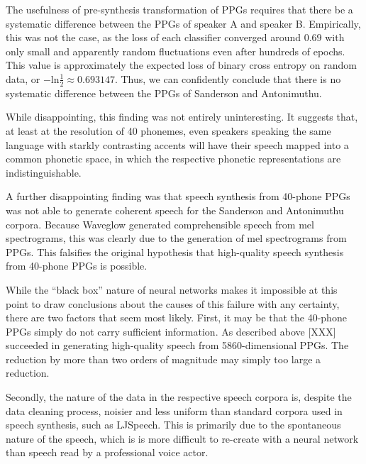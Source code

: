 The usefulness of pre-synthesis transformation of PPGs requires that there be a systematic difference between
the PPGs of speaker A and speaker B. Empirically, this was not the case, as the loss of each classifier 
converged around $0.69$ with only small and apparently random fluctuations even after hundreds of epochs. 
This value is approximately the expected loss of binary cross entropy on random data,
or $-\textrm{ln} \frac{1}{2} \approx 0.693147$. Thus, we can confidently conclude that there is no systematic 
difference between the PPGs of Sanderson and Antonimuthu.

While disappointing, this finding was not entirely uninteresting. It suggests that, at least at the 
resolution of 40 phonemes, even speakers speaking the same language with starkly contrasting accents 
will have their speech mapped into a common phonetic space, in which the respective phonetic representations 
are indistinguishable.

A further disappointing finding was that speech synthesis from 40-phone PPGs was not able to generate coherent 
speech for the Sanderson and Antonimuthu corpora. Because Waveglow generated comprehensible speech from mel spectrograms, 
this was clearly due to the generation of mel spectrograms from PPGs. This falsifies the original hypothesis that 
high-quality speech synthesis from 40-phone PPGs is possible. 

While the ``black box'' nature of neural networks makes it impossible at this point to draw conclusions about 
the causes of this failure with any certainty, there are two factors that seem most likely. First, it may be 
that the 40-phone PPGs simply do not carry sufficient information. As described above [XXX] succeeded in 
generating high-quality speech from 5860-dimensional PPGs. The reduction by more than two orders of magnitude may 
simply too large a reduction.

Secondly, the nature of the data in the respective speech corpora is, despite the data cleaning process, 
noisier and less uniform than standard corpora used in speech synthesis, such as LJSpeech. This is primarily 
due to the spontaneous nature of the speech, which is is more difficult to re-create with a neural network 
than speech read by a professional voice actor.